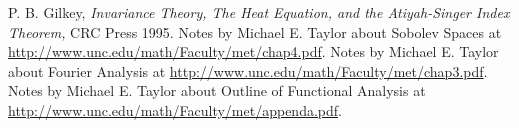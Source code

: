 \documentclass[10pt]{article} %
\begin{document}
\begin{thebibliography}{9}
	P. B. Gilkey, {\it Invariance Theory, The Heat Equation, and the Atiyah-Singer Index Theorem,} CRC Press 1995.
	Notes by Michael E. Taylor about Sobolev Spaces at \url{http://www.unc.edu/math/Faculty/met/chap4.pdf}.
	Notes by Michael E. Taylor about Fourier Analysis at \url{http://www.unc.edu/math/Faculty/met/chap3.pdf}.
	Notes by Michael E. Taylor about Outline of Functional Analysis
		at \url{http://www.unc.edu/math/Faculty/met/appenda.pdf}.
\end{thebibliography}
\end{document}
